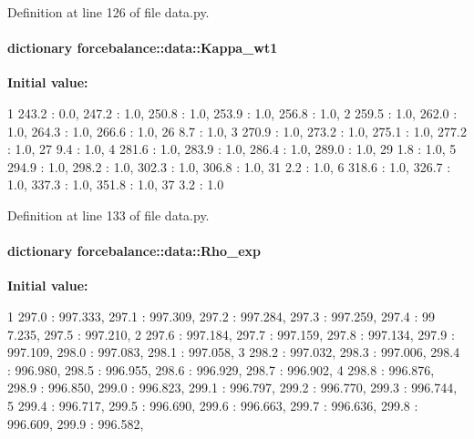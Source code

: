 \-Definition at line 126 of file data.\-py.

\hypertarget{namespaceforcebalance_1_1data_ad221cfaf38dccc85761eb1776a3f575d}{
\paragraph[{\-Kappa\-\_\-wt1}]{\setlength{\rightskip}{0pt plus 5cm}dictionary {\bf forcebalance\-::data\-::\-Kappa\-\_\-wt1}}}\label{namespaceforcebalance_1_1data_ad221cfaf38dccc85761eb1776a3f575d}
{\bfseries \-Initial value\-:}
\begin{DoxyCode}
1 {243.2 : 0.0, 247.2 : 1.0, 250.8 : 1.0, 253.9 : 1.0, 256.8 : 1.0, 
2                          259.5 : 1.0, 262.0 : 1.0, 264.3 : 1.0, 266.6 : 1.0, 26
      8.7 : 1.0, 
3                          270.9 : 1.0, 273.2 : 1.0, 275.1 : 1.0, 277.2 : 1.0, 27
      9.4 : 1.0, 
4                          281.6 : 1.0, 283.9 : 1.0, 286.4 : 1.0, 289.0 : 1.0, 29
      1.8 : 1.0, 
5                          294.9 : 1.0, 298.2 : 1.0, 302.3 : 1.0, 306.8 : 1.0, 31
      2.2 : 1.0, 
6                          318.6 : 1.0, 326.7 : 1.0, 337.3 : 1.0, 351.8 : 1.0, 37
      3.2 : 1.0}
\end{DoxyCode}


\-Definition at line 133 of file data.\-py.

\hypertarget{namespaceforcebalance_1_1data_adc1abf955f8b53a4451b5e409d1cb48e}{
\paragraph[{\-Rho\-\_\-exp}]{\setlength{\rightskip}{0pt plus 5cm}dictionary {\bf forcebalance\-::data\-::\-Rho\-\_\-exp}}}\label{namespaceforcebalance_1_1data_adc1abf955f8b53a4451b5e409d1cb48e}
{\bfseries \-Initial value\-:}
\begin{DoxyCode}
1 {297.0 : 997.333, 297.1 : 997.309, 297.2 : 997.284, 297.3 : 997.259, 297.4 : 99
      7.235, 297.5 : 997.210,
2                        297.6 : 997.184, 297.7 : 997.159, 297.8 : 997.134, 297.9
       : 997.109, 298.0 : 997.083, 298.1 : 997.058,
3                        298.2 : 997.032, 298.3 : 997.006, 298.4 : 996.980, 298.5
       : 996.955, 298.6 : 996.929, 298.7 : 996.902,
4                        298.8 : 996.876, 298.9 : 996.850, 299.0 : 996.823, 299.1
       : 996.797, 299.2 : 996.770, 299.3 : 996.744,
5                        299.4 : 996.717, 299.5 : 996.690, 299.6 : 996.663, 299.7
       : 996.636, 299.8 : 996.609, 299.9 : 996.582, }
\end{DoxyCode}


